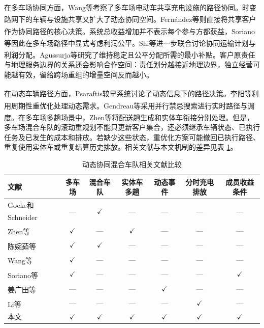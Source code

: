 \documentclass{setp-new}
\newcommand{\setptabsetup}{\fontsize{9pt}{10.5pt}\selectfont\renewcommand{\arraystretch}{0.90}\setlength{\tabcolsep}{2.2pt}\setlength{\aboverulesep}{0.4pt}\setlength{\belowrulesep}{0.4pt}\hbadness=10000}
\begin{document}
在多车场协同方面，Wang等考察了多车场电动车共享充电设施的路径协同\textsuperscript{\cite{ref:7}}。时变路网下的车辆与设施共享又扩大了动态协同空间\textsuperscript{\cite{ref:25}}。Fern\'andez等则直接将共享客户作为协同路径的核心决策\textsuperscript{\cite{ref:49}}。系统总收益增加并不表示每个参与方都获益，Soriano等因此在多车场路径中显式考虑利润公平\textsuperscript{\cite{ref:8}}。Shi等进一步联合讨论协同运输计划与利润分配\textsuperscript{\cite{ref:9}}。Agussurja等研究了维持稳定且公平分配所需的最小补贴\textsuperscript{\cite{ref:10}}。客户原责任与地理服务边界的关系还会影响合作空间：责任划分越接近地理边界，独立经营可能越有效，留给跨场重组的增量空间反而越小。

在动态车辆路径方面，Psaraftis较早系统讨论了动态信息下的路径决策\textsuperscript{\cite{ref:14}}。李阳等利用周期性重优化处理动态需求\textsuperscript{\cite{ref:18}}。Gendreau等采用并行禁忌搜索进行实时路径与调度\textsuperscript{\cite{ref:22}}。在多车场多趟场景中，Zhen等将配送趟生成和实体车衔接分别处理\textsuperscript{\cite{ref:44}}。但是，多车场混合车队的滚动重规划不能只更新客户集合，还必须继承车辆状态、已执行任务及已发生的成本和排放。若缺少这些状态，重优化方案可能撤回已执行路径、重复使用实体车或重复结算历史排放。相关文献与本文机制的差异见表 \ref{tab:literature-comparison}。

\begin{table}[H]
\centering
\caption{动态协同混合车队相关文献比较}
\label{tab:literature-comparison}
\setptabsetup
\begin{tabular*}{0.96\linewidth}{@{\extracolsep{\fill}}lcccccc@{}}
\toprule
文献 & 多车场 & 混合车队 & 实体车多趟 & 动态事件 & 分时充电排放 & 成员收益条件\\
\midrule
Goeke和Schneider\textsuperscript{\cite{ref:27}} & --- & $\checkmark$ & --- & --- & --- & ---\\
Zhen等\textsuperscript{\cite{ref:44}} & $\checkmark$ & --- & $\checkmark$ & --- & --- & ---\\
陈婉茹等\textsuperscript{\cite{ref:23}} & $\checkmark$ & $\checkmark$ & --- & --- & --- & ---\\
Wang等\textsuperscript{\cite{ref:7}} & $\checkmark$ & --- & --- & --- & --- & ---\\
Soriano等\textsuperscript{\cite{ref:8}} & $\checkmark$ & --- & --- & --- & --- & $\checkmark$\\
姜广田等\textsuperscript{\cite{ref:51}} & --- & --- & --- & $\checkmark$ & --- & ---\\
Li等\textsuperscript{\cite{ref:52}} & --- & --- & --- & --- & $\checkmark$ & ---\\
本文 & $\checkmark$ & $\checkmark$ & $\checkmark$ & $\checkmark$ & $\checkmark$ & $\checkmark$\\
\bottomrule
\end{tabular*}
\end{table}
\end{document}
